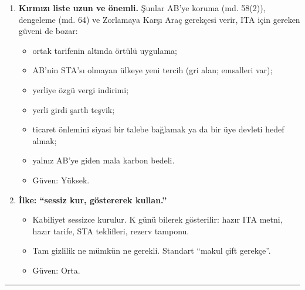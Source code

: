 \begin{enumerate}
  \begin{itemize}
  \tightlist
  \item
    Tarife, İGV, ÖTV ve KDV Cumhurbaşkanı kararıyla bir gecede değişir (31.12.2020 emsali).
  \item
    Ticaret savunması yavaş: geçici önlem en erken 60 gün sonra, kesin önlem 12--18 ay sonra geliyor. Hazırlık şimdi yapılmalı.
  \item
    Çekmece mevzuatı iç taslak olarak kalmalı. Resmî tasarı, 1/95 md. 57(2) uyarınca Komisyon'la istişareyi gerektirir.
  \item
    \etiketV{} Güven: Yüksek.
  \end{itemize}
\item
  \textbf{Kırmızı liste uzun ve önemli.} Şunlar AB'ye koruma (md. 58(2)), dengeleme (md. 64) ve Zorlamaya Karşı Araç gerekçesi verir, ITA için gereken güveni de bozar:

  \begin{itemize}
  \tightlist
  \item
    ortak tarifenin altında örtülü uygulama;
  \item
    AB'nin STA'sı olmayan ülkeye yeni tercih (gri alan; emsalleri var);
  \item
    yerliye özgü vergi indirimi;
  \item
    yerli girdi şartlı teşvik;
  \item
    ticaret önlemini siyasi bir talebe bağlamak ya da bir üye devleti hedef almak;
  \item
    yalnız AB'ye giden mala karbon bedeli.
  \item
    \etiketV{} Güven: Yüksek.
  \end{itemize}
\item
  \textbf{İlke: ``sessiz kur, göstererek kullan.''}

  \begin{itemize}
  \tightlist
  \item
    Kabiliyet sessizce kurulur. K günü bilerek gösterilir: hazır ITA metni, hazır tarife, STA teklifleri, rezerv tamponu.
  \item
    Tam gizlilik ne mümkün ne gerekli. Standart ``makul çift gerekçe''.
  \item
    \etiketH{} Güven: Orta.
  \end{itemize}
\end{enumerate}

\begin{center}\rule{0.5\linewidth}{0.5pt}\end{center}

